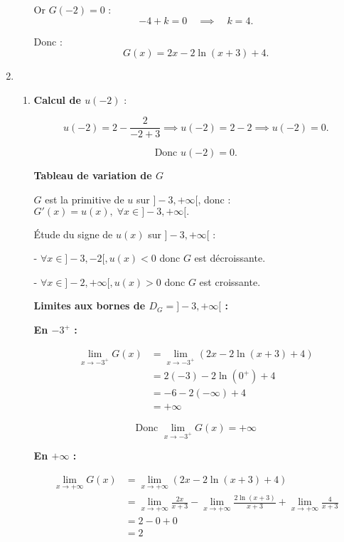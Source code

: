 \documentclass[12pt,a4paper]{article}
\begin{document}
\begin{enumerate}
\begin{enumerate}
       Or \( G(-2) = 0 \) :
    \[
    -4 + k = 0 \quad \implies \quad k = 4.
    \]

    Donc :
    \[
    G(x) = 2x - 2\ln(x+3) + 4.
    \]
\end{enumerate}

\item
\begin{enumerate}
    \item \textbf{Calcul de \( u(-2) \)} :

    \[
    u(-2) = 2 - \frac{2}{-2+3} \implies u(-2) = 2 - 2 \implies u(-2) = 0.
    \]

    \[
    \text{Donc } u(-2) = 0.
    \]
    
    \textbf{Tableau de variation de \( G \)}

\( G \) est la primitive de \( u \) sur \( ]-3, +\infty[ \), donc :$ G'(x) = u(x), \; \forall x \in ]-3, +\infty[. $

Étude du signe de \( u(x) \) sur \( ]-3, +\infty[ \) :

\begin{center}


\end{center}

- \( \forall x \in ]-3, -2[, u(x) < 0 \) donc \( G \) est décroissante.

- \( \forall x \in ]-2, +\infty[, u(x) > 0 \) donc \( G \) est croissante.

\textbf{Limites aux bornes de \( D_G = ]-3, +\infty[ \) :}

\textbf{En \( -3^+ \) :}

\begin{align*}
\lim_{x \to -3^+} G(x) &= \lim_{x \to -3^+} \left( 2x - 2\ln(x+3) + 4 \right) \\
&= 2(-3) - 2\ln(0^+) + 4 \\
&= -6 - 2(-\infty) + 4 \\
&= +\infty
\end{align*}

\[
\text{Donc } \lim_{x \to -3^+} G(x) = +\infty
\]

\textbf{En \( +\infty \) :}

\begin{align*}
\lim_{x \to +\infty} G(x) &= \lim_{x \to +\infty} \left( 2x - 2\ln(x+3) + 4 \right) \\
&= \lim_{x \to +\infty} \frac{2x}{x+3} - \lim_{x \to +\infty} \frac{2\ln(x+3)}{x+3} + \lim_{x \to +\infty} \frac{4}{x+3} \\
&= 2 - 0 + 0 \\
&= 2
\end{align*}


\end{enumerate}
\end{enumerate}
\end{document}
